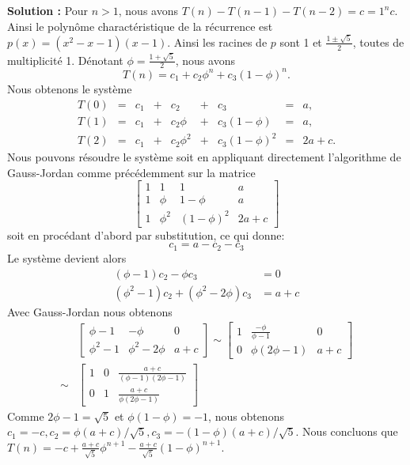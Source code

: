 \documentclass[11pt]{article} %
\newenvironment{solution}[1][\unskip]{%
	\par
	\noindent
	\textbf{Solution #1:}
	\noindent}
{\medskip}
\begin{document}
\begin{solution}
	Pour $n>1$, nous avons $T(n)-T(n-1)-T(n-2)=c=1^n c$. Ainsi le polynôme charactéristique de la récurrence est $p(x)=(x^2-x-1)(x-1)$. Ainsi les racines de $p$ sont 1 et $\frac{1\pm \sqrt{5}}{2}$, toutes de multiplicité 1. Dénotant $\phi=\frac{1+ \sqrt{5}}{2}$, nous avons
	\begin{equation*}
		T(n)= c_1 + c_2 \phi ^n + c_3 (1-\phi)^n.
	\end{equation*}
	Nous obtenons le système
	\begin{equation*}
		\begin{array}{ccccccccc}
			T(0) & = & c_1 &+ & c_2& +& c_3&=& a,\\
			T(1) & = & c_1& + & c_2\phi& + & c_3(1-\phi) & = & a, \\
			T(2) & = & c_1& + &c_2\phi^2 & + & c_3(1-\phi)^2 & = & 2a+c.
		\end{array}
	\end{equation*}
	Nous pouvons résoudre le système soit en appliquant directement l'algorithme de Gauss-Jordan comme précédemment sur la matrice
	\begin{equation*}
		\left[\begin{array}{ccc|c}
			1 & 1 & 1 & a\\
			1 & \phi & 1-\phi & a\\
			1 & \phi^2 & (1-\phi)^2 & 2a+c
		\end{array}\right]
	\end{equation*}
	soit en procédant d'abord par substitution, ce qui donne:
	$$c_1=a-c_2-c_3$$
	Le système devient alors
	\begin{align*}
		(\phi-1)c_2-\phi c_3 &= 0\\
		(\phi^2-1)c_2 + (\phi^2-2\phi)c_3 &=a+c
	\end{align*}
	Avec Gauss-Jordan nous obtenons
	\begin{align*}
		&\left[\begin{array}{cc|c}
			\phi-1 & -\phi & 0 \\
			\phi^2 -1 & \phi^2-2\phi & a+c 
		\end{array}\right] \sim \left[\begin{array}{cc|c}
		1 & \frac{-\phi}{\phi-1} & 0\\
		0 & \phi(2\phi -1) & a+c 
	\end{array}\right]\\
	\sim &\left[\begin{array}{cc|c}
		1 & 0 & \frac{a+c}{(\phi-1)(2\phi-1)}\\
		0 & 1 & \frac{a+c}{\phi(2\phi-1)} 
	\end{array}\right]
\end{align*}
Comme $2\phi -1=\sqrt{5}$ et $\phi(1-\phi)=-1$, nous obtenons $c_1= -c, c_2=\phi(a+c)/\sqrt{5}, c_3=-(1-\phi)(a+c)/\sqrt{5}$. Nous concluons que $T(n)=-c+\frac{a+c}{\sqrt{5}}\phi^{n+1}-\frac{a+c}{\sqrt{5}}(1-\phi)^{n+1}$.
\end{solution}
\end{document}
